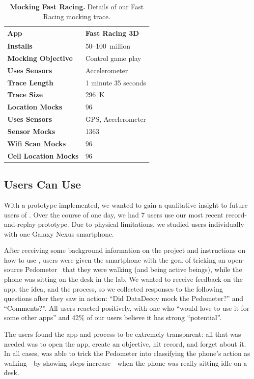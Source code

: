 \begin{table}[t]

\begin{tabularx}{3.33in}{lX}
\textbf{App} & Fast Racing 3D \\ \toprule
\textbf{Installs} & 50--100~million \\
  \textbf{Mocking Objective} & Control game play \\ \midrule
\textbf{Uses Sensors} & Accelerometer \\
\textbf{Trace Length} & 1 minute 35 seconds \\
\textbf{Trace Size} & 296~K \\
\textbf{Location Mocks} & 96 \\
\textbf{Uses Sensors} & GPS, Accelerometer \\
\textbf{Sensor Mocks} & 1363 \\
\textbf{Wifi Scan Mocks} & 96 \\
\textbf{Cell Location Mocks} & 96 \\
\end{tabularx}

\caption{\textbf{Mocking Fast Racing.} Details of our Fast Racing
  mocking trace.}

\label{table-mocking-game}
\vspace*{-0.2in}
\end{table}

\subsection{Users Can Use \PocketMocker{}}
\label{subsec-usability}


With a  prototype implemented, we wanted to gain a qualitative insight to
future users of \PocketMocker{}. Over the course of one day, we had 7 users use
our most recent record-and-replay prototype. Due to physical limitations, we
studied users individually with one Galaxy Nexus smartphone. 

After receiving some background information on the project and instructions
on how to use \PocketMocker{}, users were given the smartphone with the goal
of tricking an open-source Pedometer~\cite{pedometer-playstore-url} that they
were walking (and being active beings), while the phone was sitting on the
desk in the lab. We wanted to receive feedback on the app, the idea,
and the process, so we collected responses to the following questions after
they saw \PocketMocker{} in action: ``Did DataDecoy mock the Pedometer?'' and
``Comments?''. All users reacted positively, with one who ``would love to use
it for some other apps'' and 42\% of our users believe it has strong
``potential''. 

The users found the app and process to be extremely transparent: all
that was needed was to open the app, create an objective, hit record, and
forget about it. In all cases, \PocketMocker{} was able to trick the
Pedometer into classifying the phone's action as walking---by showing steps
increase---when the phone was really sitting idle on a desk.
